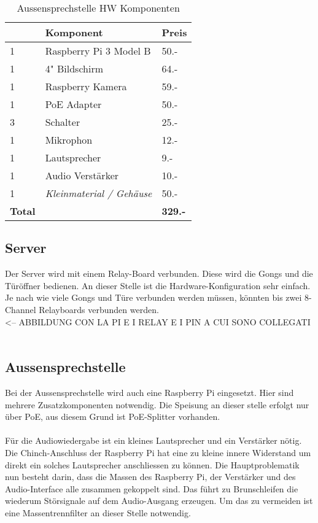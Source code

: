 \begin{table}[]
	\centering
	\label{my-label}
	\begin{tabular}{l|ll}
		\multicolumn{1}{r|}{} \textbf{Anzahl} & \textbf{Komponent} \hspace{180pt} & \textbf{Preis} 	\\ \hline
		1	&	Raspberry Pi 3 Model B		   				& 50.-			\\ \hline
		1	&	4" Bildschirm								& 64.-			\\ \hline
		1	&	Raspberry Kamera							& 59.-			\\ \hline
		1	&	PoE Adapter									& 50.-			\\ \hline
		3	&	Schalter									& 25.-			\\ \hline
		1	&	Mikrophon									& 12.-			\\ \hline
		1	&	Lautsprecher								& 9.-			\\ \hline
		1	&	Audio Verstärker							& 10.-			\\ \hline
		1	&	\textit{Kleinmaterial / Gehäuse}			& 50.-			\\ \hline
		\textbf{Total}	&									& \textbf{329.-}			\\ \hline
	\end{tabular}
	\caption{Aussensprechstelle HW Komponenten}
	\label{tbl:DoorHW}
\end{table}


\subsection{Server}
\label{sec:chapterexample}

Der Server wird mit einem Relay-Board verbunden. Diese wird die Gongs und die Türöffner bedienen. An dieser Stelle ist die Hardware-Konfiguration sehr einfach. Je nach wie viele Gongs und Türe verbunden werden müssen, könnten bis zwei 8-Channel Relayboards verbunden werden.
\\

<-- ABBILDUNG CON LA PI E I RELAY E I PIN A CUI SONO COLLEGATI
\\
\\

\subsection{Aussensprechstelle}
\label{sec:chapterexample}

Bei der Aussensprechstelle wird auch eine Raspberry Pi eingesetzt. Hier sind mehrere Zusatzkomponenten notwendig. Die Speisung an dieser stelle erfolgt nur über PoE, aus diesem Grund ist PoE-Splitter vorhanden.
\\
\\
Für die Audiowiedergabe ist ein kleines Lautsprecher und ein Verstärker nötig. Die Chinch-Anschluss der Raspberry Pi hat eine zu kleine innere Widerstand um direkt ein solches Lautsprecher anschliessen zu können. Die Hauptproblematik nun besteht darin, dass die Massen des Raspberry Pi, der Verstärker und des Audio-Interface alle zusammen gekoppelt sind. Das führt zu Brunschleifen die wiederum Störsignale auf dem Audio-Ausgang erzeugen. Um das zu vermeiden ist eine Massentrennfilter an dieser Stelle notwendig.
\\

